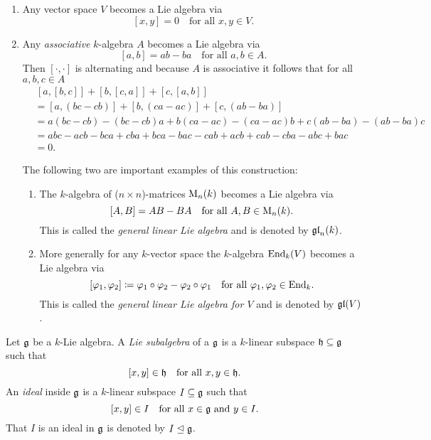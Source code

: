 \begin{expls}
 \begin{enumerate}[leftmargin=*]
  \item
   Any vector space $V$ becomes a Lie algebra via
   \[
    [x,y] = 0 \quad \text{for all $x,y \in V$}.
   \]
  \item
   Any \emph{associative} $k$-algebra $A$ becomes a Lie algebra via
   \[
    [a,b] = ab-ba \quad \text{for all $a,b \in A$}.
   \]
   Then $[\cdot, \cdot]$ is alternating and because $A$ is associative it follows that for all $a,b,c \in A$
   \begin{align*}
    &\, [a,[b,c]] + [b,[c,a]] + [c,[a,b]] \\
    &= [a, (bc-cb)] + [b, (ca-ac)] + [c, (ab-ba)] \\
    &= a(bc-cb)-(bc-cb)a + b(ca-ac) - (ca-ac)b + c(ab-ba) - (ab-ba)c \\
    &= abc -acb -bca +cba +bca -bac -cab +acb +cab -cba -abc +bac \\
    &= 0.
   \end{align*}
   
   The following two are important examples of this construction:
   \begin{enumerate}
    \item
     The $k$-algebra of ($n \times n$)-matrices $\operatorname{M}_n(k)$ becomes a Lie algebra via
     \[
      [A,B] = AB-BA \quad \text{for all $A,B \in \operatorname{M}_n(k)$}.
     \]
     This is called the \emph{general linear Lie algebra} and is denoted by $\mathfrak{gl}_n(k)$.
    \item
     More generally for any $k$-vector space the $k$-algebra $\operatorname{End}_k(V)$ becomes a Lie algebra via
     \[
      [\varphi_1, \varphi_2] \coloneqq \varphi_1 \circ \varphi_2 - \varphi_2 \circ \varphi_1
      \quad
      \text{for all $\varphi_1, \varphi_2 \in \operatorname{End}_k$}.
     \]
     This is called the \emph{general linear Lie algebra for $V$} and is denoted by $\mathfrak{gl}(V)$.
   \end{enumerate}
 \end{enumerate}
\end{expls}


\begin{defi}
 Let $\mathfrak{g}$ be a $k$-Lie algebra. A \emph{Lie subalgebra} of a $\mathfrak{g}$ is a $k$-linear subspace $\mathfrak{h} \subseteq \mathfrak{g}$ such that
 \[
  [x,y] \in \mathfrak{h} \quad \text{for all $x,y \in \mathfrak{h}$}.
 \]
 An \emph{ideal} inside $\mathfrak{g}$ is a $k$-linear subspace $I \subseteq \mathfrak{g}$ such that
 \[
  [x,y] \in I \quad \text{for all $x \in \mathfrak{g}$ and $y \in I$}.
 \]
 That $I$ is an ideal in $\mathfrak{g}$ is denoted by $I \trianglelefteq \mathfrak{g}$.
\end{defi}


